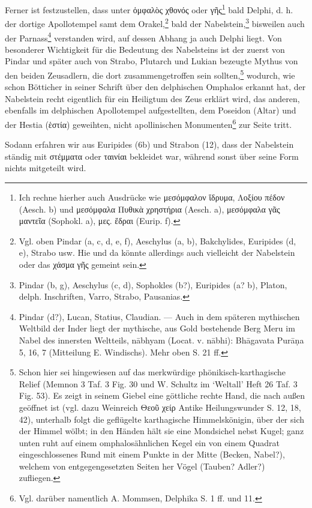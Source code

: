 \documentclass[a4paper, 11pt, oneside]{article}
\begin{document}
Ferner ist festzustellen, dass unter ὀμφαλὸς χθονός oder γῆς\footnote{Ich rechne hierher auch Ausdrücke wie μεσόμφαλον ἵδρυμα, Λοξίου πέδον (Aesch. b) und μεσόμφαλα Πυθικὰ χρηστήρια (Aesch. a), μεσόμφαλα γᾶς μαντεῖα (Sophokl. a), μες. ἕδραι (Eurip. f).} bald Delphi, d. h. der dortige Apollotempel samt dem Orakel,\footnote{Vgl. oben Pindar (a, c, d, e, f), Aeschylus (a, b), Bakchylides, Euripides (d, e), Strabo usw. Hie und da könnte allerdings auch vielleicht der Nabelstein oder das χάσμα γῆς gemeint sein.} bald der Nabelstein,\footnote{Pindar (b, g), Aeschylus (c, d), Sophokles (b?), Euripides (a? b), Platon, delph. Inschriften, Varro, Strabo, Pausanias.} bisweilen auch der Parnass\footnote{Pindar (d?), Lucan, Statius, Claudian. --- Auch in dem späteren mythischen Weltbild der Inder liegt der mythische, aus Gold bestehende Berg Meru im Nabel des innersten Weltteils, nābhyam (Locat. v. nābhi): Bhāgavata Purāṇa 5, 16, 7 (Mitteilung E. Windischs). Mehr oben S. 21 ff.} verstanden wird, auf dessen Abhang ja auch Delphi liegt. Von besonderer Wichtigkeit für die Bedeutung des Nabelsteins ist der zuerst von Pindar und später auch von Strabo, Plutarch und Lukian bezeugte Mythus von den beiden Zeusadlern, die dort zusammengetroffen sein sollten,\footnote{Schon hier sei hingewiesen auf das merkwürdige phönikisch-karthagische Relief (Memnon 3 Taf. 3 Fig. 30 und W. Schultz im `Weltall' Heft 26 Taf. 3 Fig. 53). Es zeigt in seinem Giebel eine göttliche rechte Hand, die nach außen geöffnet ist (vgl. dazu Weinreich Θεοῦ χείρ Antike Heilungswunder S. 12, 18, 42), unterhalb folgt die geflügelte karthagische Himmelskönigin, über der sich der Himmel wölbt; in den Händen hält sie eine Mondsichel nebst Kugel; ganz unten ruht auf einem omphalosähnlichen Kegel ein von einem Quadrat eingeschlossenes Rund mit einem Punkte in der Mitte (Becken, Nabel?), welchem von entgegengesetzten Seiten her Vögel (Tauben? Adler?) zufliegen.} wodurch, wie schon Bötticher in seiner Schrift über den delphischen Omphalos erkannt hat, der Nabelstein recht eigentlich für ein Heiligtum des Zeus erklärt wird, das anderen, ebenfalls im delphischen Apollotempel aufgestellten, dem Poseidon (Altar) und der Hestia (ἑστία) geweihten, nicht apollinischen Monumenten\footnote{Vgl. darüber namentlich A. Mommsen, Delphika S. 1 ff. und 11.} zur Seite tritt.

Sodann erfahren wir aus Euripides (6b) und Strabon (12), dass der Nabelstein ständig mit στέμματα oder ταινίαι bekleidet war, während sonst über seine Form nichts mitgeteilt wird.
\end{document}
